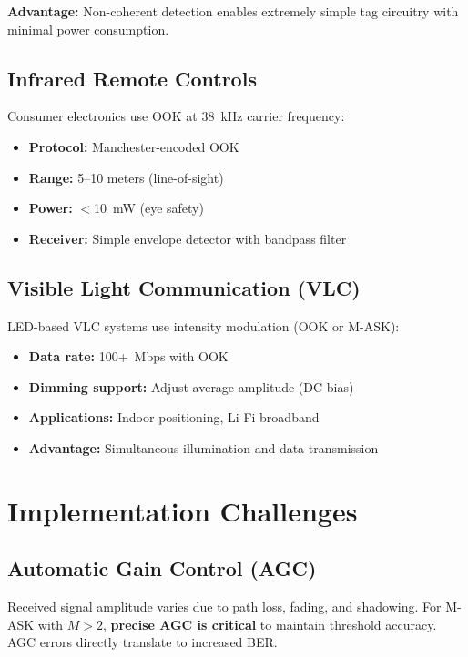 \textbf{Advantage:} Non-coherent detection enables extremely simple tag circuitry with minimal power consumption.

\subsection{Infrared Remote Controls}

Consumer electronics use OOK at 38~kHz carrier frequency:

\begin{itemize}
\item \textbf{Protocol:} Manchester-encoded OOK
\item \textbf{Range:} 5--10 meters (line-of-sight)
\item \textbf{Power:} $<$10~mW (eye safety)
\item \textbf{Receiver:} Simple envelope detector with bandpass filter
\end{itemize}

\subsection{Visible Light Communication (VLC)}

LED-based VLC systems use intensity modulation (OOK or M-ASK):

\begin{itemize}
\item \textbf{Data rate:} 100+~Mbps with OOK
\item \textbf{Dimming support:} Adjust average amplitude (DC bias)
\item \textbf{Applications:} Indoor positioning, Li-Fi broadband
\item \textbf{Advantage:} Simultaneous illumination and data transmission
\end{itemize}



\section{Implementation Challenges}

\subsection{Automatic Gain Control (AGC)}

\begin{warningbox}
Received signal amplitude varies due to path loss, fading, and shadowing. For M-ASK with $M > 2$, \textbf{precise AGC is critical} to maintain threshold accuracy. AGC errors directly translate to increased BER.
\end{warningbox}

